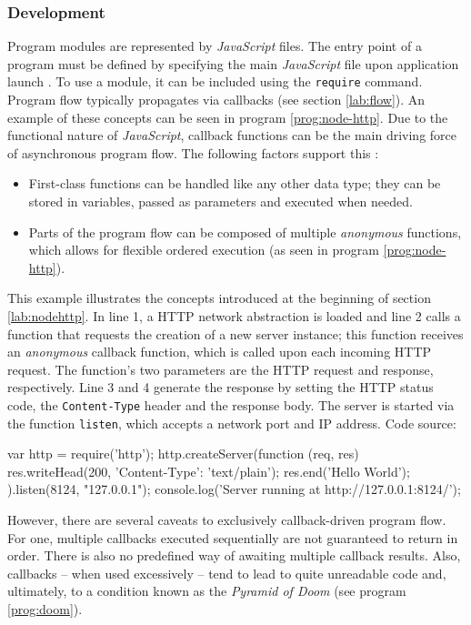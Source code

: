 \subsubsection*{Development}
\label{lab:nodehttp}
Program modules are represented by \textit{JavaScript} files. The entry point of a program must be defined by specifying the main \textit{JavaScript} file upon application launch \cite[p. 16]{Hughes-Croucher2012}. To use a module, it can be included using the \texttt{require} command. Program flow typically propagates via callbacks (see section \ref{lab:flow}). An example of these concepts can be seen in program \ref{prog:node-http}. Due to the functional nature of \textit{JavaScript}, callback functions can be the main driving force of asynchronous program flow. The following factors support this \cite{node-loop}:
\begin{itemize}
  \item First-class functions can be handled like any other data type; they can be stored in variables, passed as parameters and executed when needed.
  \item Parts of the program flow can be composed of multiple \textit{anonymous} functions, which allows for flexible ordered execution (as seen in program \ref{prog:node-http}).
\end{itemize}
\begin{program}
  \caption{This example illustrates the concepts introduced at the beginning of section \ref{lab:nodehttp}. In line 1, a HTTP network abstraction is loaded and line 2 calls a function that requests the creation of a new server instance; this function receives an \textit{anonymous} callback function, which is called upon each incoming HTTP request. The function's two parameters are the HTTP request and response, respectively. Line 3 and 4 generate the response by setting the HTTP status code, the \texttt{Content-Type} header and the response body. The server is started via the function \texttt{listen}, which accepts a network port and IP address. Code source: \cite[p. 9]{Hughes-Croucher2012}}
  \label{prog:node-http}
  \begin{JavaCode}
var http = require('http');
http.createServer(function (req, res) {
    res.writeHead(200, {'Content-Type': 'text/plain'}); 
    res.end('Hello World\n');
}).listen(8124, "127.0.0.1");
console.log('Server running at http://127.0.0.1:8124/');
  \end{JavaCode}
\end{program}
However, there are several caveats to exclusively callback-driven program flow. For one, multiple callbacks executed sequentially are not guaranteed to return in order. There is also no predefined way of awaiting multiple callback results. Also, callbacks -- when used excessively -- tend to lead to quite unreadable code and, ultimately, to a condition known as the \textit{Pyramid of Doom} (see program \ref{prog:doom}).
